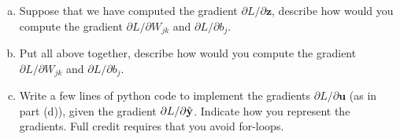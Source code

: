 \documentclass[11pt]{article}
\newcommand{\ubf}{\mathbf{u}}
\newcommand{\zbf}{\mathbf{z}}
\begin{document}
\begin{enumerate}
\begin{enumerate}[(a)]
\item
Suppose that we have computed the gradient $\partial L/\partial \zbf$, describe how would you compute the gradient
 $\partial L/\partial W_{jk}$ and $\partial L/\partial b_j$.

 \item
 Put all above together, describe how would you compute the gradient  $\partial L/\partial W_{jk}$ and $\partial L/\partial b_j$.


\item Write a few lines of python code to implement the gradients  $\partial L/\partial \ubf$ (as in part (d)), given the gradient $\partial L/\partial \hat{\bf y}$.
Indicate how you represent the gradients.
Full credit requires that you avoid for-loops.

\end{enumerate}

\end{enumerate}
\end{document}

